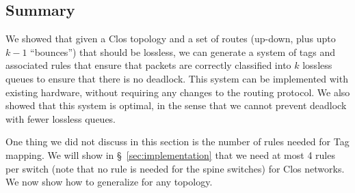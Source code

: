 \subsection {Summary}

We showed that given a Clos topology and a set of routes (up-down, plus
upto $k-1$ ``bounces'') that should be lossless, we can generate a system of
tags and associated rules that ensure that packets are correctly classified
into $k$ lossless queues to ensure that there is no deadlock.   This system can
be implemented with existing hardware, without requiring any changes to the
routing protocol. We also showed that this system is optimal, in the sense that
we cannot prevent deadlock with fewer lossless queues.

One thing we did not discuss in this section is the number of rules needed for Tag mapping. 
We will show in \S~\ref{sec:implementation} that we need at most 4 rules per switch 
(note that no rule is needed for the spine switches) for Clos networks.
We now show how to generalize \sysname{} for any topology.
